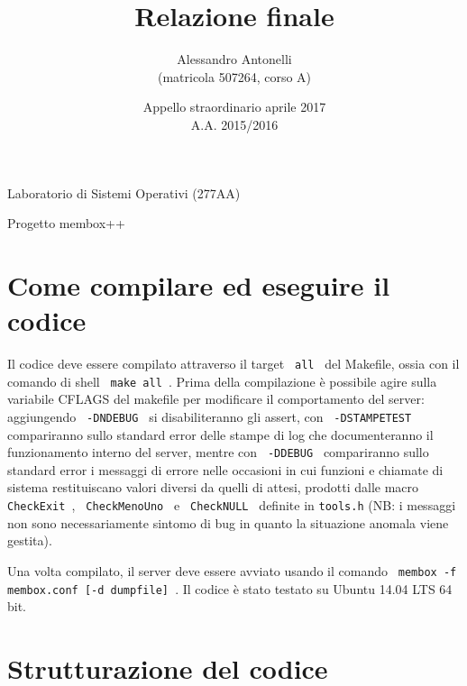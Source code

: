\documentclass[a4paper,12pt]{article}
\title { Relazione finale }
\author { Alessandro Antonelli\\(matricola 507264, corso A) }
\date { Appello straordinario aprile 2017\\A.A. 2015/2016 }
\begin{document}
\begin{center}
  Laboratorio di Sistemi Operativi (277AA)

  Progetto membox++
\end{center}
\begin{minipage}{\textwidth}
   \maketitle
\end{minipage}

\tableofcontents


\section{ Come compilare ed eseguire il codice }

Il codice deve essere compilato attraverso il target \texttt{ all } del Makefile, ossia con il comando di shell \texttt{ make all }. Prima della compilazione è possibile agire sulla variabile CFLAGS del makefile per modificare il comportamento del server: aggiungendo \texttt{ -DNDEBUG } si disabiliteranno gli assert, con \texttt{ -DSTAMPETEST } compariranno sullo standard error delle stampe di log che documenteranno il funzionamento interno del server, mentre con \texttt{ -DDEBUG } compariranno sullo standard error i messaggi di errore nelle occasioni in cui funzioni e chiamate di sistema restituiscano valori diversi da quelli di attesi, prodotti dalle macro \texttt{ CheckExit }, \texttt{ CheckMenoUno } e \texttt{ CheckNULL } definite in \texttt{tools.h} (NB: i messaggi non sono necessariamente sintomo di bug in quanto la situazione anomala viene gestita).

Una volta compilato, il server deve essere avviato usando il comando \texttt{ membox -f membox.conf [-d dumpfile] }. Il codice è stato testato su Ubuntu 14.04 LTS 64 bit.

\section{ Strutturazione del codice }
\end{document}
